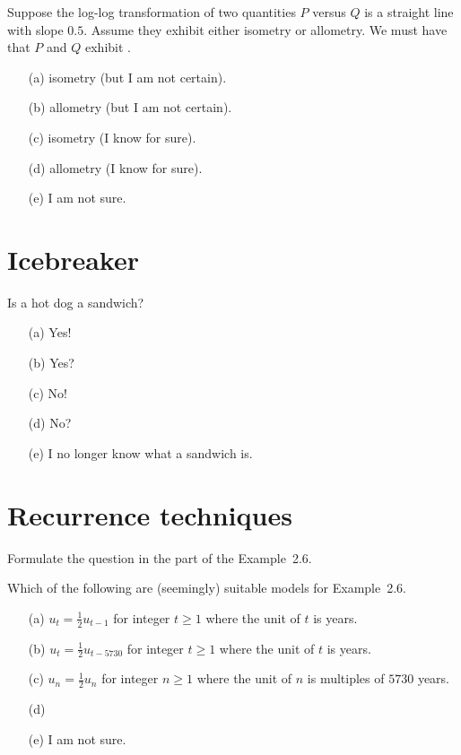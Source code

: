 \documentclass[14pt]{beamer}
\begin{document}
\begin{frame}[t]
  Suppose the log-log transformation of two quantities \(P\) versus \(Q\) is a straight line with slope \(0.5\).  Assume they exhibit either isometry or allometry. We must have that \(P\) and \(Q\) exhibit \underline{\hspace{1in}}.  

  \begin{itemize} \setlength\itemsep{1ex}
    \item[(a)] isometry (but I am not certain).
    \item[(b)] allometry (but I am not certain).
    \item[(c)] isometry (I know for sure).
    \item[(d)] allometry (I know for sure).
    \item[(e)] I am not sure.
  \end{itemize} 
\end{frame}

\section{Icebreaker}

\begin{frame}
  Is a hot dog a sandwich?
  
  \medskip
  \begin{itemize} \setlength\itemsep{2ex}
    \item[(a)] Yes!
    \item[(b)] Yes?
    \item[(c)] No!
    \item[(d)] No?
    \item[(e)] I no longer know what a sandwich is.
  \end{itemize} 
\end{frame}


\section{Recurrence techniques}

\begin{frame}
  Formulate the question in the \faComment{} part of the Example~2.6.
\end{frame}

\begin{frame}
  Which of the following are (seemingly) suitable models for Example~2.6.

  \begin{itemize} \setlength\itemsep{1ex}
    \item[(a)] \(u_{t} = \frac{1}{2} u_{t-1}\) for integer \(t \ge 1\) where the unit of \(t\) is years.
    \item[(b)] \(u_{t} = \frac{1}{2} u_{t - 5730}\) for integer \(t \ge 1\) where the unit of \(t\) is years.
    \item[(c)] \(u_{n} = \frac{1}{2} u_{n}\) for integer \(n \ge 1\) where the unit of \(n\) is multiples of \(5730\) years.
    \item[(d)] 
    \item[(e)] I am not sure. 
  \end{itemize}
\end{frame}
\end{document}
